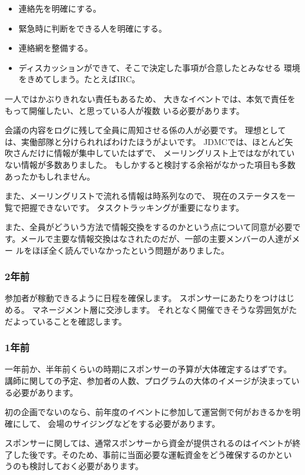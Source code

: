 \documentclass[mingoth,a4paper]{jsarticle}
\begin{document}
\begin{itemize}
 \item 連絡先を明確にする。
 \item 緊急時に判断をできる人を明確にする。
 \item 連絡網を整備する。
 \item ディスカッションができて、そこで決定した事項が合意したとみなせる
       環境をきめてしまう。たとえばIRC。
\end{itemize}

一人ではかぶりきれない責任もあるため、
大きなイベントでは、本気で責任をもって開催したい、と思っている人が複数
いる必要があります。

会議の内容をログに残して全員に周知させる係の人が必要です。
理想としては、実働部隊と分けられればわけたほうがよいです。
JDMCでは、ほとんど矢吹さんだけに情報が集中していたはずで、
メーリングリスト上ではながれていない情報が多数ありました。
もしかすると検討する余裕がなかった項目も多数あったかもしれません。

また、メーリングリストで流れる情報は時系列なので、
現在のステータスを一覧で把握できないです。
タスクトラッキングが重要になります。

また、全員がどういう方法で情報交換をするのかという点について同意が必要で
す。メールで主要な情報交換はなされたのだが、一部の主要メンバーの人達がメー
ルをほぼ全く読んでいなかったという問題がありました。


\subsubsection{2年前}
参加者が稼動できるように日程を確保します。
スポンサーにあたりをつけはじめる。
マネージメント層に交渉します。
それとなく開催できそうな雰囲気がただよっていることを確認します。

\subsubsection{1年前}

一年前か、半年前くらいの時期にスポンサーの予算が大体確定するはずです。
講師に関しての予定、参加者の人数、プログラムの大体のイメージが決まってい
る必要があります。

初の企画でないのなら、前年度のイベントに参加して運営側で何がおきるかを明確にして、
会場のサイジングなどをする必要があります。

スポンサーに関しては、通常スポンサーから資金が提供されるのはイベントが終
了した後です。そのため、事前に当面必要な運転資金をどう確保するのかとい
うのも検討しておく必要があります。
\end{document}
